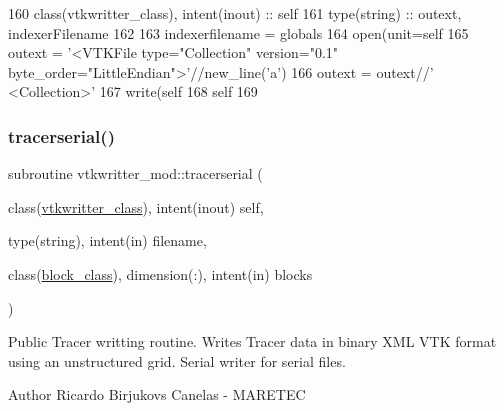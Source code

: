 \begin{DoxyCode}
160     \textcolor{keywordtype}{class}(vtkwritter\_class), \textcolor{keywordtype}{intent(inout)} :: self
161     \textcolor{keywordtype}{type}(string) :: outext, indexerFilename
162     
163     indexerfilename = globals%
164     \textcolor{keyword}{open}(unit=self%
165     outext = \textcolor{stringliteral}{'<VTKFile type="Collection" version="0.1" byte\_order="LittleEndian">'}//new\_line(\textcolor{stringliteral}{'a'})
166     outext = outext//\textcolor{stringliteral}{'  <Collection>'}    
167     \textcolor{keyword}{write}(self%
168     self%
169     
\end{DoxyCode}
\mbox{\label{namespacevtkwritter__mod_ac11e4d1d71141e6de89ba67508212ce0}} 
\subsubsection{\texorpdfstring{tracerserial()}{tracerserial()}}
{\footnotesize\ttfamily subroutine vtkwritter\+\_\+mod\+::tracerserial (\begin{DoxyParamCaption}\item[{class(\mbox{\hyperlink{structvtkwritter__mod_1_1vtkwritter__class}{vtkwritter\+\_\+class}}), intent(inout)}]{self,  }\item[{type(string), intent(in)}]{filename,  }\item[{class(\mbox{\hyperlink{structblocks__mod_1_1block__class}{block\+\_\+class}}), dimension(\+:), intent(in)}]{blocks }\end{DoxyParamCaption})\hspace{0.3cm}{\ttfamily [private]}}



Public Tracer writting routine. Writes Tracer data in binary X\+ML V\+TK format using an unstructured grid. Serial writer for serial files. 

\begin{DoxyAuthor}{Author}
Ricardo Birjukovs Canelas -\/ M\+A\+R\+E\+T\+EC 
\end{DoxyAuthor}

